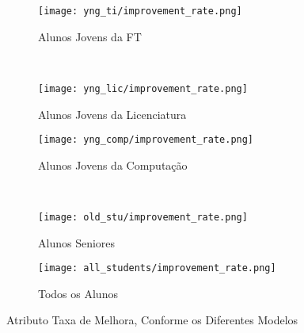\clearpage
\begin{figure}[!ht]
    \centering
    \begin{subfigure}[b]{0.48\textwidth}
        \centering
        \texttt{[image: yng\_ti/improvement\_rate.png]}
        \caption{Alunos Jovens da FT}
    \end{subfigure}
    ~
    \begin{subfigure}[b]{0.48\textwidth}
        \centering
        \texttt{[image: yng\_lic/improvement\_rate.png]}
        \caption{Alunos Jovens da Licenciatura}
    \end{subfigure}

    \begin{subfigure}[b]{0.48\textwidth}
        \centering
        \texttt{[image: yng\_comp/improvement\_rate.png]}
        \caption{Alunos Jovens da Computação}
    \end{subfigure}
    ~
    \begin{subfigure}[b]{0.48\textwidth}
        \centering
        \texttt{[image: old\_stu/improvement\_rate.png]}
        \caption{Alunos Seniores}
    \end{subfigure}

    \begin{subfigure}[b]{0.48\textwidth}
        \centering
        \texttt{[image: all\_students/improvement\_rate.png]}
        \caption{Todos os Alunos}
    \end{subfigure}
    \caption{Atributo Taxa de Melhora, Conforme os Diferentes Modelos}
\end{figure}

